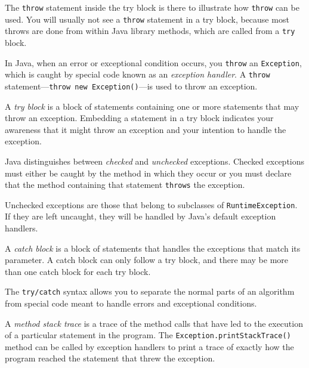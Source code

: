 The {\tt throw} statement inside the try block is there
to illustrate how {\tt throw} can be used.  You will
usually not see a {\tt throw} statement in a try block,
because most throws are done from within Java library methods,
which are called from a {\tt try} block.


\begin{SMBL}
\item  In Java, when an error or exceptional condition occurs,
you {\tt throw} an {\tt Exception}, which is caught by special code
known as an {\it exception handler}. A {\tt throw} statement---{\tt throw new Exception()}---is used to throw an exception.

\item   A {\it try block} is a block of statements containing one
or more statements that may throw an exception.   Embedding a statement
in a try block indicates your awareness that it might throw an
exception and your intention to handle the exception.

\item  Java distinguishes between {\it checked} and {\it unchecked}
exceptions.  Checked exceptions must either be caught by the method in
which they occur or you must declare that the method containing that
statement {\tt throws} the exception.


\item  Unchecked exceptions are those that belong to
subclasses of {\tt Runtime\-Exception}. If they are left uncaught, they
will be handled by Java's default exception handlers.


\item  A {\it catch block} is a block of statements that handles
the exceptions that match its parameter.   A catch block can only
follow a try block, and there may be more than one catch block
for each try block.

\item  The {\tt try/catch} syntax allows you to separate the normal
parts of an algorithm from special code meant to handle errors
and exceptional conditions.

\item  A {\it method stack trace} is a trace of the method calls
that have led to the execution of a particular statement in the
program.  The {\tt Exception.print\-StackTrace()} method can be
called by exception handlers to print a trace of exactly how
the program reached the statement that threw the exception.


\end{SMBL}
